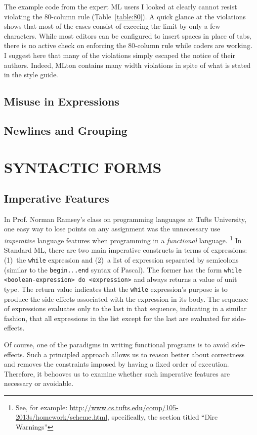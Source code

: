 \documentclass[12pt,abstracton]{scrartcl}
\begin{document}
The example code from the expert ML users I looked at clearly cannot
resist violating the 80-column rule (Table~\ref{table:80}). A quick glance
at the violations shows that most of the cases consist of exceeing the limit
by only a few characters. While most editors can be configured to insert
spaces in place of tabs, there is no active check on enforcing the 80-column
rule while coders are working. I suggest here that many of the violations
simply escaped the notice of their authors. Indeed, MLton contains
many width violations in spite of what is stated in the style guide.
\subsection{Misuse in Expressions}
\subsection{Newlines and Grouping}
\section{SYNTACTIC FORMS}\label{sec:syntax}
\subsection{Imperative Features}\label{subsec:imper}
In Prof. Norman Ramsey's class on programming languages at Tufts University, one easy way to lose points
on any assignment was the unnecessary use \emph{imperative} language features when programming in a \emph{functional} language.
\footnote{See, for example: \url{http://www.cs.tufts.edu/comp/105-2013s/homework/scheme.html}, specifically, the section titled ``Dire Warnings''}
In Standard ML, there are two main imperative constructs in terms of expressions:
(1)~the \texttt{while} expression and (2)~a list of expression separated by semicolons (similar to the \texttt{begin...end} syntax of Pascal)\cite{Ull98}.
The former has the form \texttt{while <boolean-expression> do <expression>} and always returns a value of unit type.
The return value indicates that the \texttt{while} expression's purpose is to produce the side-effects associated
with the expression in its body. The sequence of expressions evaluates only to the last in that sequence, indicating
in a similar fashion, that all expressions in the list except for the last are evaluated for side-effects.

Of course, one of the paradigms in writing functional programs is to avoid side-effects.
Such a principled approach allows us to reason better about correctness and
removes the constraints imposed by having a fixed order of execution.\cite{Hug90} Therefore,
it behooves us to examine whether such imperative features are necessary or avoidable.
\end{document}

